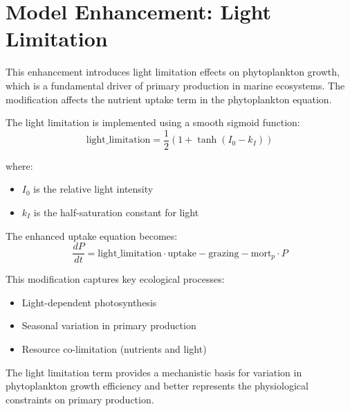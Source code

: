 \section{Model Enhancement: Light Limitation}

This enhancement introduces light limitation effects on phytoplankton growth, which is a fundamental driver of primary production in marine ecosystems. The modification affects the nutrient uptake term in the phytoplankton equation.

The light limitation is implemented using a smooth sigmoid function:
\[ \text{light\_limitation} = \frac{1}{2}(1 + \tanh(I_0 - k_I)) \]

where:
\begin{itemize}
\item $I_0$ is the relative light intensity
\item $k_I$ is the half-saturation constant for light
\end{itemize}

The enhanced uptake equation becomes:
\[ \frac{dP}{dt} = \text{light\_limitation} \cdot \text{uptake} - \text{grazing} - \text{mort}_p \cdot P \]

This modification captures key ecological processes:
\begin{itemize}
\item Light-dependent photosynthesis
\item Seasonal variation in primary production
\item Resource co-limitation (nutrients and light)
\end{itemize}

The light limitation term provides a mechanistic basis for variation in phytoplankton growth efficiency and better represents the physiological constraints on primary production.
